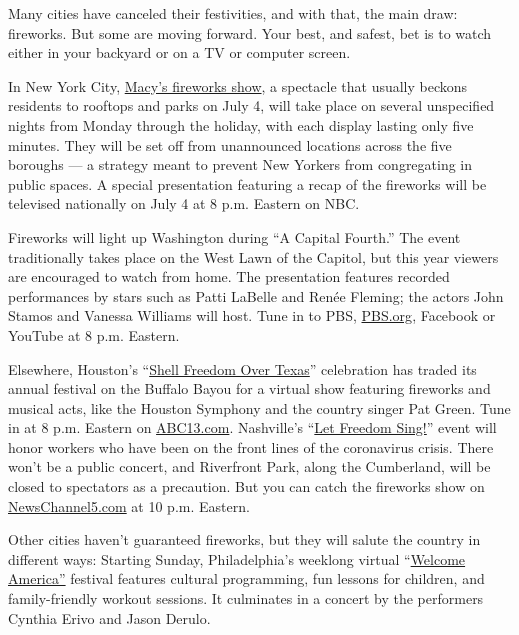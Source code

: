 Many cities have canceled their festivities, and with that, the main
draw: fireworks. But some are moving forward. Your best, and safest, bet
is to watch either in your backyard or on a TV or computer screen.

In New York City, \href{https://www.macys.com/social/fireworks/}{Macy's
fireworks show}, a spectacle that usually beckons residents to rooftops
and parks on July 4, will take place on several unspecified nights from
Monday through the holiday, with each display lasting only five minutes.
They will be set off from unannounced locations across the five boroughs
--- a strategy meant to prevent New Yorkers from congregating in public
spaces. A special presentation featuring a recap of the fireworks will
be televised nationally on July 4 at 8 p.m. Eastern on NBC.

Fireworks will light up Washington during ``A Capital Fourth.'' The
event traditionally takes place on the West Lawn of the Capitol, but
this year viewers are encouraged to watch from home. The presentation
features recorded performances by stars such as Patti LaBelle and Renée
Fleming; the actors John Stamos and Vanessa Williams will host. Tune in
to PBS, \href{http://www.pbs.org/a-capitol-fourth}{PBS.org}, Facebook or
YouTube at 8 p.m. Eastern.

Elsewhere, Houston's ``\href{https://www.houstontx.gov/july4/}{Shell
Freedom Over Texas}'' celebration has traded its annual festival on the
Buffalo Bayou for a virtual show featuring fireworks and musical acts,
like the Houston Symphony and the country singer Pat Green. Tune in at 8
p.m. Eastern on \href{https://abc13.com/}{ABC13.com}. Nashville's
``\href{https://www.visitmusiccity.com/july4th}{Let Freedom Sing!}''
event will honor workers who have been on the front lines of the
coronavirus crisis. There won't be a public concert, and Riverfront
Park, along the Cumberland, will be closed to spectators as a
precaution. But you can catch the fireworks show on
\href{https://www.newschannel5.com/}{NewsChannel5.com} at 10 p.m.
Eastern.

Other cities haven't guaranteed fireworks, but they will salute the
country in different ways: Starting Sunday, Philadelphia's weeklong
virtual
``\href{https://welcomeamerica.com/wp-content/uploads/2020/06/brochure_10_compressed.pdf}{Welcome
America''} festival features cultural programming, fun lessons for
children, and family-friendly workout sessions. It culminates in a
concert by the performers Cynthia Erivo and Jason Derulo.

